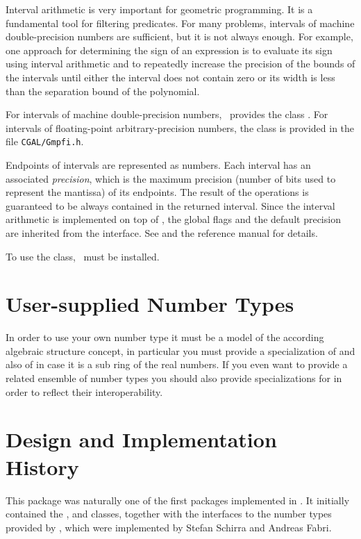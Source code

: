Interval arithmetic is very important for geometric programming. It
is a fundamental tool for filtering predicates. For many problems,
intervals of machine double-precision numbers are sufficient, but it is
not always enough. For example, one approach for determining the sign of
an expression is to evaluate its sign using interval arithmetic and to
repeatedly increase the precision of the bounds of the intervals until
either the interval does not contain zero or its width is less than the
separation bound of the polynomial.

For intervals of machine double-precision numbers, \cgal~provides
the class . For intervals of floating-point
arbitrary-precision numbers, the class  is provided in the
file {\tt CGAL/Gmpfi.h}.

Endpoints of  intervals are represented as 
numbers.  Each interval has an associated \emph{precision}, which is
the maximum precision (number of bits used to represent the mantissa)
of its endpoints.  The result of the operations is guaranteed to be
always contained in the returned interval. Since the interval arithmetic
is implemented on top of , the global flags and the default
precision are inherited from the  interface. See
\cite{cgal:r-mpfi} and the  reference manual for details.

To use the  class, \mpfi\ must be installed.


\section{User-supplied Number Types}

In order to use your own number type it must be a model of the according
algebraic structure concept, in particular you must provide a 
specialization of  and also of
 in case it is a sub ring of the real numbers. 
If you even want to provide a related ensemble of number types you should also 
provide specializations for  in order to 
reflect their interoperability. 
 

\section{Design and Implementation History}

This package was naturally one of the first packages implemented in \cgal.
It initially contained the ,  and  classes,
together with the interfaces to the number types provided by \leda, which were
implemented by Stefan Schirra and Andreas Fabri.


